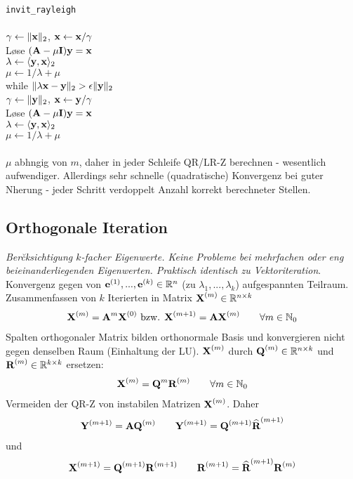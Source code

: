 \verb!invit_rayleigh!\\
{\addtolength{\leftskip}{0mm}
\hrulefill\\
$\gamma \leftarrow \Vert \mbox{\bf x} \Vert_2$, $\mbox{\bf x} \leftarrow \mbox{\bf x}/\gamma$ \\
L\o se $(\mbox{\bf A}-\mu \mbox{\bf I})\mbox{\bf y} = \mbox{\bf x}$\\
$\lambda \leftarrow \langle \mbox{\bf y},\mbox{\bf x} \rangle_2$\\
$\mu \leftarrow 1/\lambda + \mu$ \\
while $\Vert \lambda\mbox{\bf x} - \mbox{\bf y} \Vert_2 > \epsilon \Vert \mbox{\bf y} \Vert_2$ \\ 
\quad $\gamma \leftarrow \Vert \mbox{\bf y} \Vert_2$, $\mbox{\bf x} \leftarrow \mbox{\bf y}/\gamma$ \\
\quad L\o se $(\mbox{\bf A}-\mu \mbox{\bf I})\mbox{\bf y} = \mbox{\bf x}$\\
\quad $\lambda \leftarrow \langle \mbox{\bf y},\mbox{\bf x} \rangle_2$\\
\quad $\mu \leftarrow 1/\lambda + \mu$ \\
\hrulefill\\
}
$\mu$ abh\a ngig von $m$, daher in jeder Schleife QR/LR-Z berechnen - wesentlich aufwendiger. Allerdings sehr schnelle (quadratische) Konvergenz bei guter N\a herung - jeder Schritt verdoppelt Anzahl korrekt berechneter Stellen.

\subsection{Orthogonale Iteration}
\emph{Ber\u cksichtigung $k$-facher Eigenwerte. Keine Probleme bei mehrfachen oder eng beieinanderliegenden Eigenwerten. Praktisch identisch zu Vektoriteration}.\\

Konvergenz gegen von $\mbox{\bf e}^{(1)}, ..., \mbox{\bf e}^{(k)} \in \mathbb{R}^{n}$ (zu $\lambda_1,...,\lambda_k$) aufgespannten Teilraum. Zusammenfassen von $k$ Iterierten in Matrix $\mbox{\bf X}^{(m)}\in \mathbb{R}^{n \times k}$
\begin{align*}
\mbox{\bf X}^{(m)} = \mbox{\bf A}^m \mbox{\bf X}^{(0)} \text{ bzw. } \mbox{\bf X}^{(m+1)} = \mbox{\bf A} \mbox{\bf X}^{(m)}  \qquad \forall m\in \mathbb{N}_0
\end{align*}
Spalten orthogonaler Matrix bilden orthonormale Basis und konvergieren nicht gegen denselben Raum (Einhaltung der LU). $\mbox{\bf X}^{(m)}$ durch $\mbox{\bf Q}^{(m)} \in \mathbb{R}^{n \times k}$ und $\mbox{\bf R}^{(m)} \in \mathbb{R}^{k \times k}$ ersetzen: 
\begin{align*}
\mbox{\bf X}^{(m)} = \mbox{\bf Q}^m \mbox{\bf R}^{(m)} \qquad \forall m\in \mathbb{N}_0
\end{align*}
Vermeiden der QR-Z von instabilen Matrizen $\mbox{\bf X}^{(m)}$. Daher
\begin{align*}
\mbox{\bf Y}^{(m+1)} =\mbox{\bf AQ}^{(m)} \qquad \mbox{\bf Y}^{(m+1)}= \mbox{\bf Q}^{(m+1)}\widehat{\mbox{\bf R}}^{(m+1)}
\end{align*}
und 
\begin{align*}
\mbox{\bf X}^{(m+1)} = \mbox{\bf Q}^{(m+1)} \mbox{\bf R}^{(m+1)} \qquad \mbox{\bf R}^{(m+1)} = \widehat{\mbox{\bf R}}^{(m+1)}\mbox{\bf R}^{(m)}
\end{align*}

